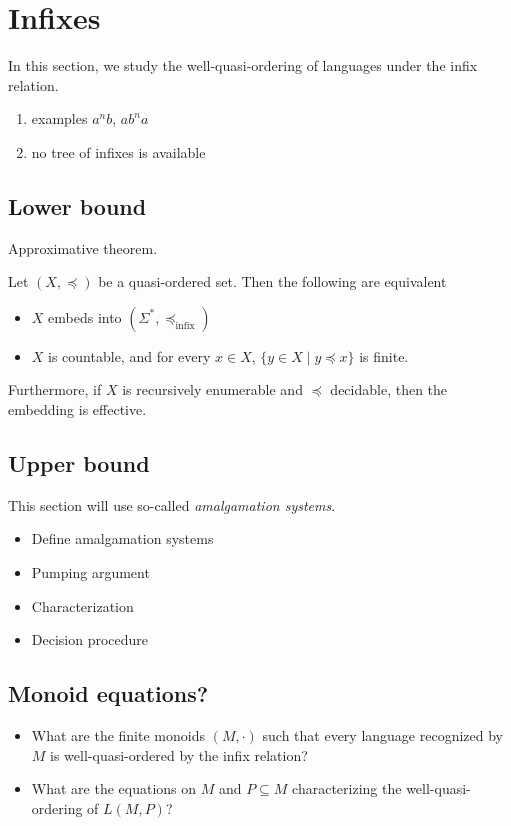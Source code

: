 
\section{Infixes}
\label{infixes:sec}


In this section, we study the well-quasi-ordering of languages under the infix
relation.

\begin{enumerate}
    \item examples $a^nb$, $a b^n a$
    \item no tree of infixes is available
\end{enumerate}

\subsection{Lower bound}

Approximative theorem.
\begin{theorem}
    Let $(X, \preceq)$ be a quasi-ordered set.
    Then the following are equivalent
    \begin{itemize}
        \item $X$ embeds into $(\Sigma^*, \preceq_{\text{infix}})$
        \item $X$ is countable, and for every $x \in X$,
            $\{y \in X \mid y \preceq x\}$ is finite.
    \end{itemize}

    Furthermore, if $X$ is recursively enumerable and $\preceq$ decidable,
    then
    the embedding is effective.
\end{theorem}


\subsection{Upper bound}

This section will use so-called \emph{amalgamation systems}.

\begin{itemize}
    \item Define amalgamation systems
    \item Pumping argument
    \item Characterization
    \item Decision procedure
\end{itemize}

\subsection{Monoid equations?}

\begin{itemize}
    \item What are the finite monoids $(M, \cdot)$ such that
    every language recognized by $M$ is well-quasi-ordered by the infix relation?
    \item What are the equations on $M$ and $P \subseteq M$ characterizing 
    the well-quasi-ordering of $L(M, P)$?
\end{itemize}

